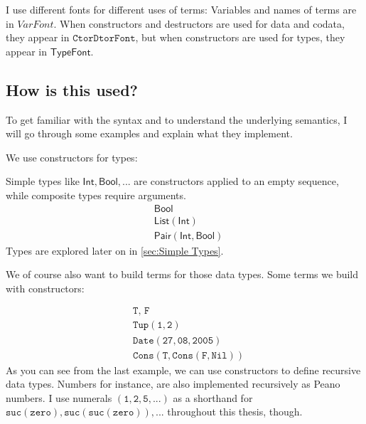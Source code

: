\documentclass[twoside,12pt,a4paper]{article}
\begin{document}
I use different fonts for different uses of terms: 
Variables and names of terms are in $VarFont$. When constructors and destructors are used for data and codata, they appear in $\mathtt{CtorDtorFont}$, 
but when constructors are used for types, they appear in $\mathsf{TypeFont}$.

\subsection{How is this used?}

To get familiar with the syntax and to understand the underlying semantics, 
I will go through some examples and explain what they implement.

We use constructors for types:
\begin{example}
    Simple types like $\mathsf{Int, Bool, ...}$ are constructors applied to an empty sequence, 
    while composite types require arguments.
    \begin{align*}
        &\mathsf{Bool}\tag{1}\\
        &\mathsf{List(Int)}\tag{2}\\
        &\mathsf{Pair(Int, Bool)}\tag{3}
    \end{align*}
    Types are explored later on in \cref{sec:Simple Types}.
\end{example}

We of course also want to build terms for those data types. 
Some terms we build with constructors:

\begin{example}
    \begin{align*}
        &\texttt{T, F}\tag{1}\\
        &\mathtt{Tup(1,2)}\tag{2}\\
        &\mathtt{Date(27, 08, 2005)}\tag{3}\\
        &\mathtt{Cons(T, Cons(F, Nil))}\tag{4}              
    \end{align*}
    As you can see from the last example, we can use constructors to define recursive data types.
    Numbers for instance, are also implemented recursively as Peano numbers.
    I use numerals $(\mathtt{1, 2, 5, ...})$ as a shorthand for $\mathtt{suc(zero), suc(suc(zero)), ...}$ throughout this thesis, though.
\end{example}
\end{document}
